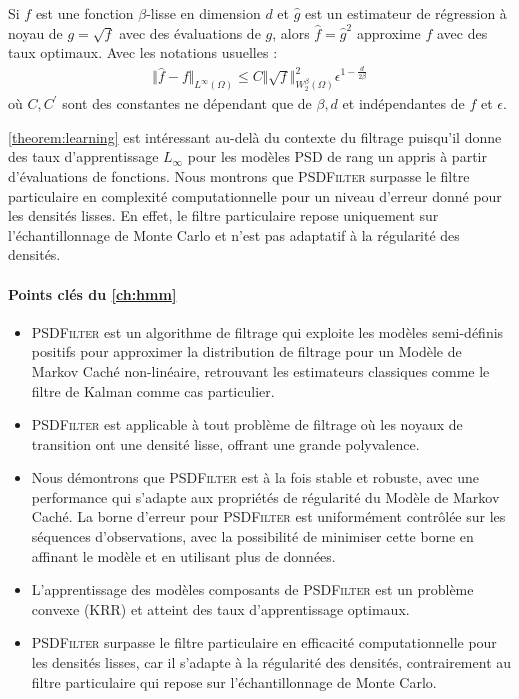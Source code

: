 \begin{mdframed}
\begin{informaltheorem}
Si $f$ est une fonction $\beta$-lisse en dimension $d$ et $\hat g$ est un estimateur de régression à noyau de $g = \sqrt{f}$ avec des évaluations de $g$, alors $\hat f = \hat g^2$ approxime $f$ avec des taux optimaux. Avec les notations usuelles :
\begin{align}
\Vert \hat f - f \Vert_{L^\infty(\Omega)}\leq C \Vert \sqrt{f}\Vert_{W^\beta_2(\Omega)}^2\epsilon^{1-\frac{d}{2\beta}}
\end{align}
où $C, C^\prime$ sont des constantes ne dépendant que de $\beta, d$ et indépendantes de $f$ et $\epsilon$.
\end{informaltheorem}
\end{mdframed}
\noindent \cref{theorem:learning} est intéressant au-delà du contexte du filtrage puisqu'il donne des taux d'apprentissage $L_\infty$ pour les modèles PSD de rang un appris à partir d'évaluations de fonctions.
Nous montrons que \textsc{PSDFilter} surpasse le filtre particulaire en complexité computationnelle pour un niveau d'erreur donné pour les densités lisses. En effet, le filtre particulaire repose uniquement sur l'échantillonnage de Monte Carlo et n'est pas adaptatif à la régularité des densités.
\paragraph{Points clés du \cref{ch:hmm}}
\begin{itemize}
\item \textsc{PSDFilter} est un algorithme de filtrage qui exploite les modèles semi-définis positifs pour approximer la distribution de filtrage pour un Modèle de Markov Caché non-linéaire, retrouvant les estimateurs classiques comme le filtre de Kalman comme cas particulier.
\item \textsc{PSDFilter} est applicable à tout problème de filtrage où les noyaux de transition ont une densité lisse, offrant une grande polyvalence.
\item Nous démontrons que \textsc{PSDFilter} est à la fois stable et robuste, avec une performance qui s'adapte aux propriétés de régularité du Modèle de Markov Caché. La borne d'erreur pour \textsc{PSDFilter} est uniformément contrôlée sur les séquences d'observations, avec la possibilité de minimiser cette borne en affinant le modèle et en utilisant plus de données.
\item L'apprentissage des modèles composants de \textsc{PSDFilter} est un problème convexe (KRR) et atteint des taux d'apprentissage optimaux.
\item \textsc{PSDFilter} surpasse le filtre particulaire en efficacité computationnelle pour les densités lisses, car il s'adapte à la régularité des densités, contrairement au filtre particulaire qui repose sur l'échantillonnage de Monte Carlo.
\end{itemize}
